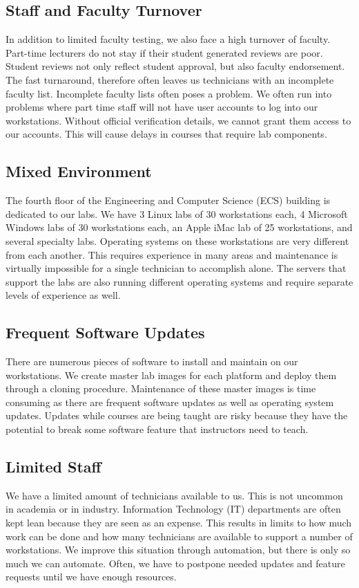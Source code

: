 \subsection{Staff and Faculty Turnover}
In addition to limited faculty testing, we also face a high turnover of faculty.  Part-time lecturers do not stay if their student generated reviews are poor.  Student reviews not only reflect student approval, but also faculty endorsement.  The fast  turnaround, therefore often leaves us technicians with an incomplete faculty list.  Incomplete faculty lists often poses a problem.  We often run into problems where part time staff will not have user accounts to log into our workstations.  Without official verification details, we cannot grant them access to our accounts.  This will cause delays in courses that require lab components. 

\subsection{Mixed Environment}
The fourth floor of the Engineering and Computer Science (ECS) building is dedicated to our labs.  We have 3 Linux labs of 30 workstations each, 4 Microsoft Windows labs of 30 workstations each, an Apple iMac lab of 25 workstations, and several specialty labs.  Operating systems on these workstations are very different from each another.  This requires experience in many areas and maintenance is virtually impossible for a single technician to accomplish alone.  The servers that support the labs are also running different operating systems and require separate levels of experience as well. 

\subsection{Frequent Software Updates}
There are numerous pieces of software to install and maintain on our workstations.  We create master lab images for each platform and deploy them through a cloning procedure.  Maintenance of these master images is time consuming as there are frequent software updates as well as operating system updates.  Updates while courses are being taught are risky because they have the potential to break some software feature that instructors need to teach. 

\subsection{Limited Staff}
We have a limited amount of technicians available to us.  This is not uncommon in academia or in industry.  Information Technology (IT) departments are often kept lean because they are seen as an expense.  This results in limits to how much work can be done and how many technicians are available to support a number of workstations.  We improve this situation through automation, but there is only so much we can automate.  Often, we have to postpone needed updates and feature requests until we have enough resources.



